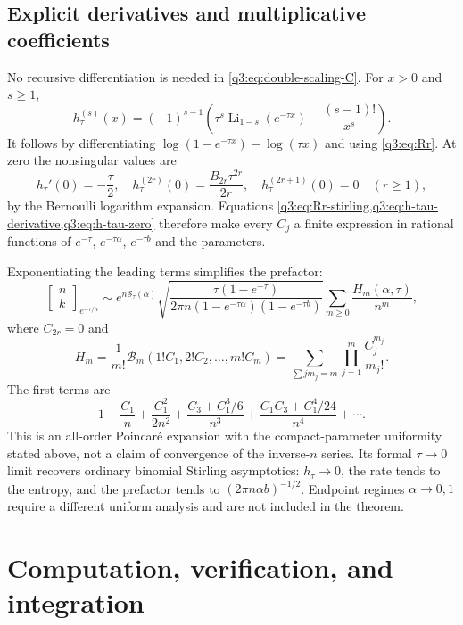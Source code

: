 \documentclass[11pt,a4paper,oneside,openany]{book}
\theoremstyle{definition}
\theoremstyle{remark}
\newcommand{\GB}[3][q]{\begin{bmatrix}#2\\#3\end{bmatrix}_{#1}}
\DeclareMathOperator{\Li}{Li}
\newcommand{\Gb}[3]{\GB[#3]{#1}{#2}}
\newcommand{\Yc}{\mathcal B}
\begin{document}
\section{Explicit derivatives and multiplicative coefficients}
No recursive differentiation is needed in \cref{q3:eq:double-scaling-C}.
For $x>0$ and $s\ge1$,
\begin{equation}
 h_\tau^{(s)}(x)=(-1)^{s-1}
  \left(\tau^s\Li_{1-s}(e^{-\tau x})-\frac{(s-1)!}{x^s}\right).
 \label{q3:eq:h-tau-derivative}
\end{equation}
It follows by differentiating
$\log(1-e^{-\tau x})-\log(\tau x)$ and using
\cref{q3:eq:Rr}. At zero the nonsingular values are
\begin{equation}
 h_\tau'(0)=-\frac\tau2,\quad
 h_\tau^{(2r)}(0)=\frac{B_{2r}\tau^{2r}}{2r},\quad
 h_\tau^{(2r+1)}(0)=0\quad(r\ge1),
 \label{q3:eq:h-tau-zero}
\end{equation}
by the Bernoulli logarithm expansion. Equations
\cref{q3:eq:Rr-stirling,q3:eq:h-tau-derivative,q3:eq:h-tau-zero}
therefore make every $C_j$ a finite expression in rational functions
of $e^{-\tau}$, $e^{-\tau\alpha}$, $e^{-\tau b}$ and the parameters.

Exponentiating the leading terms simplifies the prefactor:
\begin{equation}
 \Gb nk{e^{-\tau/n}}
 \sim e^{n\mathscr S_\tau(\alpha)}
     \sqrt{\frac{\tau(1-e^{-\tau})}
         {2\pi n(1-e^{-\tau\alpha})(1-e^{-\tau b})}}
     \sum_{m\ge0}\frac{H_m(\alpha,\tau)}{n^m},
 \label{q3:eq:double-scaling-multiplicative}
\end{equation}
where $C_{2r}=0$ and
\begin{equation}
 H_m=\frac1{m!}\Yc_m(1!C_1,2!C_2,\ldots,m!C_m)
    =\sum_{\sum jm_j=m}\prod_{j=1}^m\frac{C_j^{m_j}}{m_j!}.
 \label{q3:eq:double-scaling-H}
\end{equation}
The first terms are
\[
 1+\frac{C_1}{n}+\frac{C_1^2}{2n^2}
   +\frac{C_3+C_1^3/6}{n^3}
   +\frac{C_1C_3+C_1^4/24}{n^4}+\cdots.
\]
This is an all-order Poincar\'e expansion with the compact-parameter
uniformity stated above, not a claim of convergence of the inverse-$n$
series. Its formal $\tau\to0$ limit recovers ordinary binomial Stirling
asymptotics: $h_\tau\to0$, the rate tends to the entropy, and the
prefactor tends to $(2\pi n\alpha b)^{-1/2}$. Endpoint regimes
$\alpha\to0,1$ require a different uniform analysis and are not included
in the theorem.
\chapter{Computation, verification, and integration}
\label{q1:qcc:computation}
\end{document}
